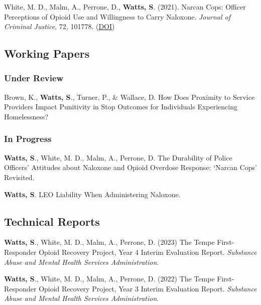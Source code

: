 \documentclass[11pt,]{article}
\begin{document}
White, M. D., Malm, A., Perrone, D., \textbf{Watts, S}. (2021). Narcan
Cops: Officer Perceptions of Opioid Use and Willingness to Carry
Naloxone. \emph{Journal of Criminal Justice}, 72, 101778.
(\href{https://www-sciencedirect-com.ezproxy1.lib.asu.edu/science/article/pii/S0047235220302725?casa_token=M3KzLm4DIoUAAAAA:KhQQ6E6WpFcNQdyfTN33-SRHRPttqc81ijlWaNX0wOOYu3TiHBIa17DzDZS2_7K_vU9_CQwdAaA}{DOI})

\vspace{2mm}

\hypertarget{working-papers}{%
\subsection{Working Papers}\label{working-papers}}

\hypertarget{under-review}{%
\subsubsection{Under Review}\label{under-review}}

Brown, K., \textbf{Watts, S}., Turner, P., \& Wallace, D. How Does
Proximity to Service Providers Impact Punitivity in Stop Outcomes for
Individuals Experiencing Homelessness?

\hypertarget{in-progress}{%
\subsubsection{In Progress}\label{in-progress}}

\textbf{Watts, S}., White, M. D., Malm, A., Perrone, D. The Durability
of Police Officers' Attitudes about Naloxone and Opioid Overdose
Response: `Narcan Cops' Revisited.

\textbf{Watts, S}. LEO Liability When Administering Naloxone.

\vspace{2mm}

\hypertarget{technical-reports}{%
\subsection{Technical Reports}\label{technical-reports}}

\textbf{Watts, S}., White, M. D., Malm, A., Perrone, D. (2023) The Tempe
First-Responder Opioid Recovery Project, Year 4 Interim Evaluation
Report. \emph{Substance Abuse and Mental Health Services
Administration}.

\textbf{Watts, S}., White, M. D., Malm, A., Perrone, D. (2022) The Tempe
First-Responder Opioid Recovery Project, Year 3 Interim Evaluation
Report. \emph{Substance Abuse and Mental Health Services
Administration}.
\end{document}
